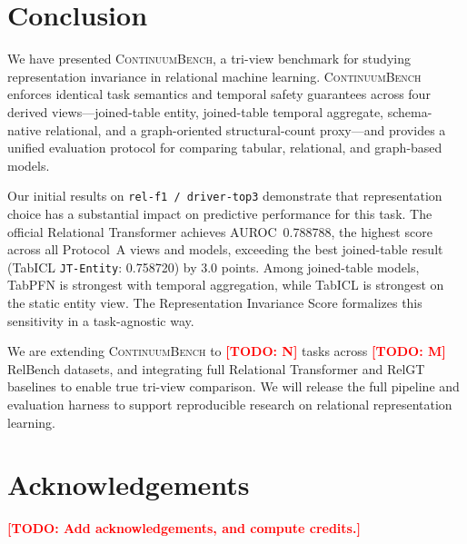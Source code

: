 \documentclass[11pt]{article}
\newcommand{\cb}{\textsc{ContinuumBench}}
\newcommand{\todo}[1]{\textcolor{red}{\textbf{[TODO: #1]}}}
\newcommand{\viewname}[1]{\texttt{#1}}
\begin{document}
\section{Conclusion}
\label{sec:conclusion}

We have presented \cb{}, a tri-view benchmark for studying
representation invariance in relational machine learning.
\cb{} enforces identical task semantics and temporal safety guarantees
across four derived views---joined-table entity, joined-table temporal
aggregate, schema-native relational, and a graph-oriented
structural-count proxy---and provides a
unified evaluation protocol for comparing tabular, relational, and
graph-based models.

Our initial results on \texttt{rel-f1 / driver-top3} demonstrate that
representation choice has a substantial impact on predictive performance
for this task.
The official Relational Transformer achieves AUROC~0.788788, the highest
score across all Protocol~A views and models, exceeding the best
joined-table result (TabICL \viewname{JT-Entity}: 0.758720) by 3.0 points.
Among joined-table models, TabPFN is strongest with temporal aggregation,
while TabICL is strongest on the static entity view.
The Representation Invariance Score formalizes this sensitivity in a
task-agnostic way.

We are extending \cb{} to \todo{N} tasks across \todo{M} RelBench
datasets, and integrating full Relational Transformer and RelGT
baselines to enable true tri-view comparison.
We will release the full pipeline and evaluation harness to support
reproducible research on relational representation learning.

\section*{Acknowledgements}
\todo{Add acknowledgements, and compute credits.}
\end{document}
